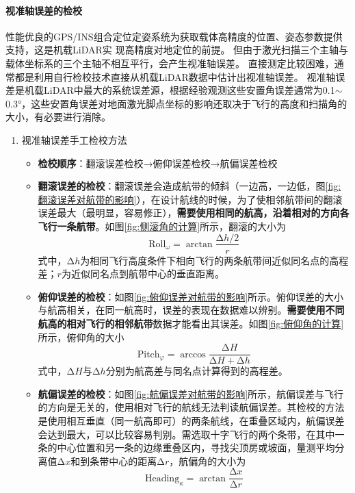 \paragraph{视准轴误差的检校}
性能优良的GPS/INS组合定位定姿系统为获取载体高精度的位置、姿态参数提供支持，这是机载LiDAR实 现高精度对地定位的前提。
但由于激光扫描三个主轴与载体坐标系的三个主轴不相互平行，会产生视准轴误差。
直接测定比较困难，通常都是利用自行检校技术直接从机载LiDAR数据中估计出视准轴误差。
视准轴误差是机载LiDAR中最大的系统误差源，根据经验观测这些安置角误差通常为0.1$ \sim $0.3°，这些安置角误差对地面激光脚点坐标的影响还取决于飞行的高度和扫描角的大小，有必要进行消除。
\begin{enumerate}
	\item {\cukai 视准轴误差手工检校方法}
		\begin{itemize}
			\item \textbf{检校顺序}：翻滚误差检校→俯仰误差检校→航偏误差检校
			\item \textbf{翻滚误差的检校}：翻滚误差会造成航带的倾斜（一边高，一边低，图\ref{fig:翻滚误差对航带的影响}），在设计航线的时候，为了使相邻航带间的翻滚误差最大（最明显，容易修正），\textbf{需要使用相同的航高，沿着相对的方向各飞行一条航带}。如图\ref{fig:侧滚角的计算}所示，翻滚的大小为
				\begin{equation}
				\text{Roll}_ω = \arctan \dfrac{∆h / 2}{r}
				\end{equation}
				式中，$ ∆h $为相同飞行高度条件下相向飞行的两条航带间近似同名点的高程差；$ r $为近似同名点到航带中心的垂直距离。
			\item \textbf{俯仰误差的检校}：如图\ref{fig:俯仰误差对航带的影响}所示。俯仰误差的大小与航高相关，在同一航高时，误差的表现在数据难以辨别。\textbf{需要使用不同航高的相对飞行的相邻航带}数据才能看出其误差。如图\ref{fig:俯仰角的计算}所示，俯仰角的大小
				\begin{equation}
				\text{Pitch}_φ = \arccos\dfrac{∆H}{∆H + ∆h}
				\end{equation}
				式中，$ ∆H $与$ ∆h $分别为航高差与同名点计算得到的高程差。
			\item \textbf{航偏误差的检校}：如图\ref{fig:航偏误差对航带的影响}所示，航偏误差与飞行的方向是无关的，使用相对飞行的航线无法判读航偏误差。其检校的方法是使用相互垂直（同一航高即可）的两条航线，在重叠区域内，航偏误差会达到最大，可以比较容易判别。需选取十字飞行的两个条带，在其中一条的中心位置和另一条的边缘重叠区内，寻找尖顶房或坡面，量测平均分离值$ ∆x $和到条带中心的距离$ ∆r $，航偏角的大小为
				\begin{equation}
				\text{Heading}_κ = \arctan \dfrac{∆x}{∆r}

\end{equation}
\end{itemize}
\end{enumerate}

